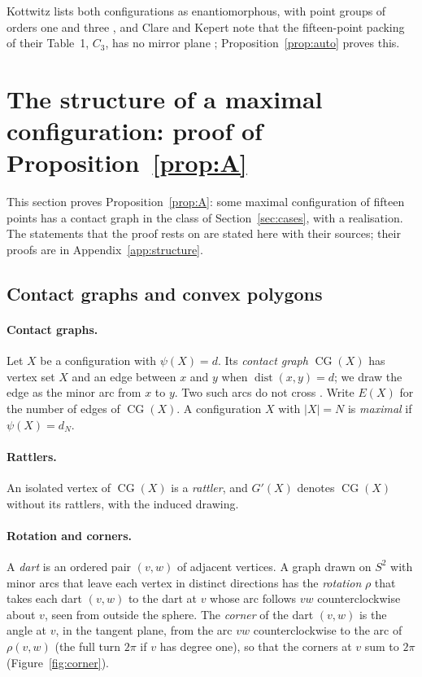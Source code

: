 \documentclass[12pt]{amsart}
\theoremstyle{definition}
\theoremstyle{plain}
\theoremstyle{definition}
\newcommand{\Sph}{S^2}
\newcommand{\dist}{\operatorname{dist}}
\newcommand{\CG}{\operatorname{CG}}
\newcommand{\CIII}{C_3}
\newcommand{\leanmap}[1]{\ignorespaces}
\newcommand{\mapnote}[1]{\ignorespaces}
\begin{document}
Kottwitz lists both configurations as enantiomorphous, with point groups of orders one and three \cite[Table~1]{Kot}, and Clare and Kepert note that the fifteen-point packing of their Table~1, $\CIII$, has no mirror plane \cite[p.~342]{CK}; Proposition~\ref{prop:auto} proves this.

\section{The structure of a maximal configuration: proof of Proposition~\ref{prop:A}}\label{sec:structure}\leanmap{Tammes15.Geom.IsCPoly, Tammes15.Geom.Inside, Tammes15.Geom.InClosed, Tammes15.Geom.perim, Tammes15.StrictSupportFace, Tammes15.IsAngular, Tammes15.ocorner}\mapnote{the convex polygons, their insides, closed polygons and perimeters, the rotation of a drawing and its corners}

This section proves Proposition~\ref{prop:A}: some maximal configuration of fifteen points has a contact graph in the class of Section~\ref{sec:cases}, with a realisation. The statements that the proof rests on are stated here with their sources; their proofs are in Appendix~\ref{app:structure}.

\subsection{Contact graphs and convex polygons}

\paragraph{Contact graphs.} Let $X$ be a configuration with $\psi(X)=d$. Its \emph{contact graph} $\CG(X)$ has vertex set $X$ and an edge between $x$ and $y$ when $\dist(x,y)=d$; we draw the edge as the minor arc from $x$ to $y$. Two such arcs do not cross \cite[Proposition~3.1]{MT13}. Write $E(X)$ for the number of edges of $\CG(X)$. A configuration $X$ with $|X|=N$ is \emph{maximal} if $\psi(X)=d_N$.

\paragraph{Rattlers.} An isolated vertex of $\CG(X)$ is a \emph{rattler}, and $G'(X)$ denotes $\CG(X)$ without its rattlers, with the induced drawing.

\paragraph{Rotation and corners.} A \emph{dart} is an ordered pair $(v,w)$ of adjacent vertices. A graph drawn on $\Sph$ with minor arcs that leave each vertex in distinct directions has the \emph{rotation} $\rho$ that takes each dart $(v,w)$ to the dart at $v$ whose arc follows $vw$ counterclockwise about $v$, seen from outside the sphere. The \emph{corner} of the dart $(v,w)$ is the angle at $v$, in the tangent plane, from the arc $vw$ counterclockwise to the arc of $\rho(v,w)$ (the full turn $2\pi$ if $v$ has degree one), so that the corners at $v$ sum to $2\pi$ (Figure~\ref{fig:corner}).
\end{document}
